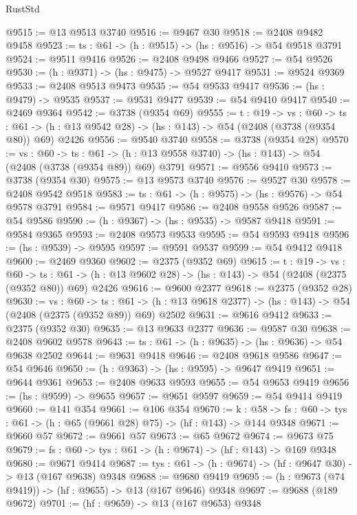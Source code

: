 \begin{lexlean}{RustStd}
\begin{coremodule}
@9515 := @13 @9513 @3740
@9516 := @9467 @30
@9518 := @2408 @9482 @9458
@9523 := {ts : @61} -> (h : @9515) -> (hs : @9516) -> @54 @9518 @3791
@9524 := @9511 @9416
@9526 := @2408 @9498 @9466
@9527 := @54 @9526
@9530 := (h : @9371) -> (hs : @9475) -> @9527 @9417
@9531 := @9524 @9369
@9533 := @2408 @9513 @9473
@9535 := @54 @9533 @9417
@9536 := (hs : @9479) -> @9535
@9537 := @9531 @9477
@9539 := @54 @9410 @9417
@9540 := @2469 @9364
@9542 := @3738 (@9354 @69)
@9555 := {t : @19} ->
  {vs : @60} ->
  {ts : @61} -> (h : @13 @9542 @28) -> (hs : @143) -> @54 (@2408 (@3738 (@9354 @80)) @69) @2426
@9556 := @9540 @3740
@9558 := @3738 (@9354 @28)
@9570 := {vs : @60} ->
  {ts : @61} -> (h : @13 @9558 @3740) -> (hs : @143) -> @54 (@2408 (@3738 (@9354 @89)) @69) @3791
@9571 := @9556 @9410
@9573 := @3738 (@9354 @30)
@9575 := @13 @9573 @3740
@9576 := @9527 @30
@9578 := @2408 @9542 @9518
@9583 := {ts : @61} -> (h : @9575) -> (hs : @9576) -> @54 @9578 @3791
@9584 := @9571 @9417
@9586 := @2408 @9558 @9526
@9587 := @54 @9586
@9590 := (h : @9367) -> (hs : @9535) -> @9587 @9418
@9591 := @9584 @9365
@9593 := @2408 @9573 @9533
@9595 := @54 @9593 @9418
@9596 := (hs : @9539) -> @9595
@9597 := @9591 @9537
@9599 := @54 @9412 @9418
@9600 := @2469 @9360
@9602 := @2375 (@9352 @69)
@9615 := {t : @19} ->
  {vs : @60} ->
  {ts : @61} -> (h : @13 @9602 @28) -> (hs : @143) -> @54 (@2408 (@2375 (@9352 @80)) @69) @2426
@9616 := @9600 @2377
@9618 := @2375 (@9352 @28)
@9630 := {vs : @60} ->
  {ts : @61} -> (h : @13 @9618 @2377) -> (hs : @143) -> @54 (@2408 (@2375 (@9352 @89)) @69) @2502
@9631 := @9616 @9412
@9633 := @2375 (@9352 @30)
@9635 := @13 @9633 @2377
@9636 := @9587 @30
@9638 := @2408 @9602 @9578
@9643 := {ts : @61} -> (h : @9635) -> (hs : @9636) -> @54 @9638 @2502
@9644 := @9631 @9418
@9646 := @2408 @9618 @9586
@9647 := @54 @9646
@9650 := (h : @9363) -> (hs : @9595) -> @9647 @9419
@9651 := @9644 @9361
@9653 := @2408 @9633 @9593
@9655 := @54 @9653 @9419
@9656 := (hs : @9599) -> @9655
@9657 := @9651 @9597
@9659 := @54 @9414 @9419
@9660 := @141 @354
@9661 := @106 @354
@9670 := {k : @58} ->
  {fs : @60} -> {tys : @61} -> (h : @65 (@9661 @28) @75) -> (hf : @143) -> @144 @9348
@9671 := @9660 @57
@9672 := @9661 @57
@9673 := @65 @9672
@9674 := @9673 @75
@9679 := {fs : @60} -> {tys : @61} -> (h : @9674) -> (hf : @143) -> @169 @9348
@9680 := @9671 @9414
@9687 := {tys : @61} -> (h : @9674) -> (hf : @9647 @30) -> @13 (@167 @9638) @9348
@9688 := @9680 @9419
@9695 := (h : @9673 (@74 @9419)) -> (hf : @9655) -> @13 (@167 @9646) @9348
@9697 := @9688 (@189 @9672)
@9701 := (hf : @9659) -> @13 (@167 @9653) @9348

\end{coremodule}
\end{lexlean}
